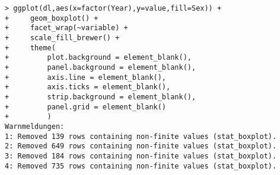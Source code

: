 \begin{frame}
\begin{enumerate}
\begin{verbatim}
> ggplot(dl,aes(x=factor(Year),y=value,fill=Sex)) +
+     geom_boxplot() +
+     facet_wrap(~variable) +
+     scale_fill_brewer() +
+     theme(
+         plot.background = element_blank(),
+         panel.background = element_blank(),
+         axis.line = element_blank(),
+         axis.ticks = element_blank(),
+         strip.background = element_blank(),
+         panel.grid = element_blank()
+         )
Warnmeldungen:
1: Removed 139 rows containing non-finite values (stat_boxplot). 
2: Removed 649 rows containing non-finite values (stat_boxplot). 
3: Removed 184 rows containing non-finite values (stat_boxplot). 
4: Removed 735 rows containing non-finite values (stat_boxplot).   
\end{verbatim}
  \end{enumerate}
\end{frame}
